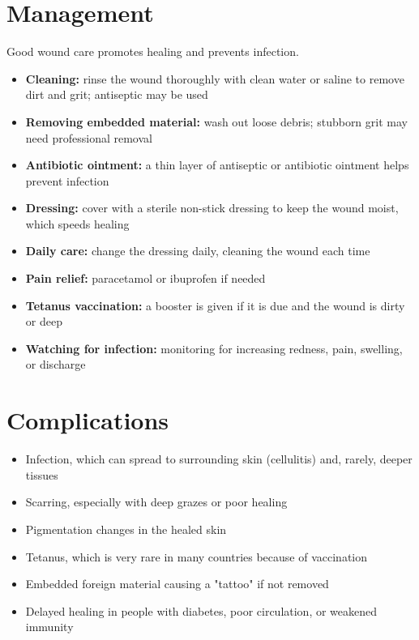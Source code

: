 \section*{Management}
Good wound care promotes healing and prevents infection.

\begin{itemize}
    \item \textbf{Cleaning:} rinse the wound thoroughly with clean water or saline to remove dirt and grit; antiseptic may be used
    \item \textbf{Removing embedded material:} wash out loose debris; stubborn grit may need professional removal
    \item \textbf{Antibiotic ointment:} a thin layer of antiseptic or antibiotic ointment helps prevent infection
    \item \textbf{Dressing:} cover with a sterile non-stick dressing to keep the wound moist, which speeds healing
    \item \textbf{Daily care:} change the dressing daily, cleaning the wound each time
    \item \textbf{Pain relief:} paracetamol or ibuprofen if needed
    \item \textbf{Tetanus vaccination:} a booster is given if it is due and the wound is dirty or deep
    \item \textbf{Watching for infection:} monitoring for increasing redness, pain, swelling, or discharge
\end{itemize}

\section*{Complications}
\begin{itemize}
    \item Infection, which can spread to surrounding skin (cellulitis) and, rarely, deeper tissues
    \item Scarring, especially with deep grazes or poor healing
    \item Pigmentation changes in the healed skin
    \item Tetanus, which is very rare in many countries because of vaccination
    \item Embedded foreign material causing a "tattoo" if not removed
    \item Delayed healing in people with diabetes, poor circulation, or weakened immunity
\end{itemize}

